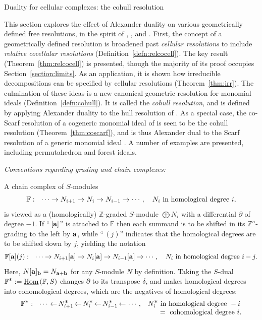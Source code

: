 \documentclass[12pt,leqno]{article}
\def\Ast{{\textstyle \ast}}
\def\from{{\,\leftarrow\,}}
\def\hhom{{{\underline{\rm Hom}}{\scriptscriptstyle \,}}}
\def\aa{{{\rm \bf a}}}
\def\bb{{{\rm \bf b}}}
\def\FF{{\mathbb F}}
\def\ZZ{{\mathbb Z}}
\begin{document}
\begin{section}{Duality for cellular complexes: the cohull resolution}%


\label{section:cellular}

\noindent
This section explores the effect of Alexander duality on various
geometrically defined free resolutions, in the spirit of \cite{BPS},
\cite{BS}, and \cite{Stu}.  First, the concept of a geometrically defined
resolution is broadened past {\it cellular resolutions} to include {\it
relative cocellular resolutions} (Definition~\ref{defn:relcocell}).  The
key result (Theorem~\ref{thm:relcocell}) is presented, though the
majority of its proof occupies Section~\ref{section:limits}.  As an
application, it is shown how irreducible decompositions can be specified
by cellular resolutions (Theorem~\ref{thm:irr}).  The culmination of
these ideas is a new canonical geometric resolution for monomial ideals
(Definition~\ref{defn:cohull}).  It is called the {\it cohull
resolution}, and is defined by applying Alexander duality to the hull
resolution of \cite{BS}.  As a special case, the co-Scarf resolution of a
cogeneric monomial ideal of \cite{Stu} is seen to be the cohull
resolution (Theorem~\ref{thm:coscarf}), and is thus Alexander dual to the
Scarf resolution of a generic monomial ideal \cite{BPS}.  A number of
examples are presented, including permutahedron and forest ideals.

\noindent
{\it Conventions regarding grading and chain complexes:}

{\narrower\noindent
A chain complex of $S$-modules 
$$
  \FF:\ \ \cdots \to N_{i+1} \to N_i \to N_{i-1} \to \cdots,\ \ \ N_i\
  {\rm in\ homological\ degree}\ i,
$$
is viewed as a (homologically) $\ZZ$-graded $S$-module $\bigoplus N_i$
with a differential $\partial$ of degree $-1$.  If ``$\,[\aa]$'' is
attached to $\FF$ then each summand is to be shifted in its
$\ZZ^n$-grading to the left by $\aa$, while ``$\,(j)$'' indicates that
the homological degrees are to be shifted down by $j$, yielding the
notation
$$
\FF[\aa](j):\ \ \cdots \to N_{i+1}[\aa] \to N_i[\aa] \to N_{i-1}[\aa]
\to \cdots,\ \ \ N_i\ {\rm in\ homological\ degree}\ i-j.
$$
Here, $N[\aa]_\bb = N_{\aa+\bb}$ for any $S$-module $N$ by definition.
Taking the $S$-dual $\FF^\Ast := \hhom(\FF,S)$ changes $\partial$ to its
transpose $\delta$, and makes homological degrees into cohomological
degrees, which are the negatives of homological degrees:
$$
\begin{array}{rl}
\FF^\Ast:\ \ \cdots \from N_{i+1}^\Ast \from N_i^\Ast \from
	N_{i-1}^\Ast \from \cdots, &
N_i^\Ast\ \hbox{in homological degree}\ -i
\cr
& \phantom{N_i^\Ast} =\ \hbox{cohomological degree}\ i.
\end{array}
$$
}


\end{section}
\end{document}
